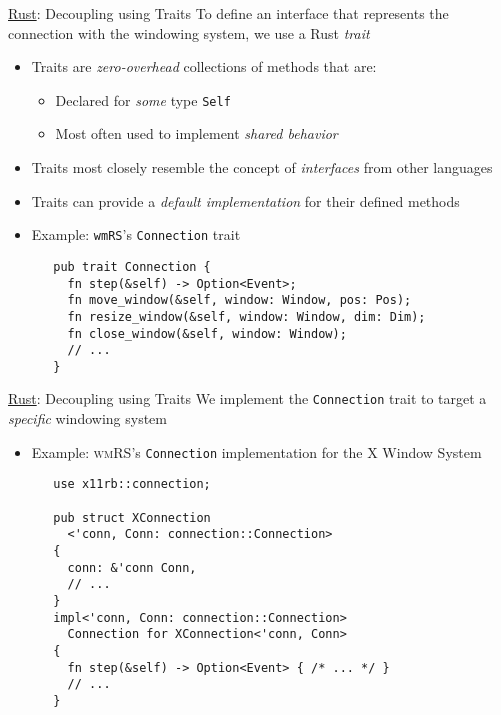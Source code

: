 \begin{frame}[c,fragile]{\underline{Rust}: Decoupling using Traits \hfill {\footnotesize \currentname}}
    To define an interface that represents the connection with the windowing system, we use a Rust \textit{trait}
    \begin{itemize}

        \item Traits are \textit{zero-overhead} collections of methods that are:\\
            \begin{itemize}
                \item Declared for \textit{some} type \texttt{Self}
                \item Most often used to implement \textit{shared behavior}
            \end{itemize}

        \item Traits most closely resemble the concept of \textit{interfaces} from other languages\\

        \item Traits can provide a \textit{default implementation} for their defined methods\\

        \item Example: \texttt{wmRS}'s \texttt{Connection} trait\\
\begin{verbatim}
   pub trait Connection {
     fn step(&self) -> Option<Event>;
     fn move_window(&self, window: Window, pos: Pos);
     fn resize_window(&self, window: Window, dim: Dim);
     fn close_window(&self, window: Window);
     // ...
   }
\end{verbatim}

    \end{itemize}

\end{frame}

\begin{frame}[c,fragile]{\underline{Rust}: Decoupling using Traits \hfill {\footnotesize \currentname}}
    We implement the \texttt{Connection} trait to target a \textit{specific} windowing system
    \begin{itemize}

        \item Example: \textsc{wmRS}'s \texttt{Connection} implementation for the X Window System\\
\begin{verbatim}
   use x11rb::connection;

   pub struct XConnection
     <'conn, Conn: connection::Connection>
   {
     conn: &'conn Conn,
     // ...
   }
   impl<'conn, Conn: connection::Connection>
     Connection for XConnection<'conn, Conn>
   {
     fn step(&self) -> Option<Event> { /* ... */ }
     // ...
   }
\end{verbatim}

    \end{itemize}

\end{frame}
